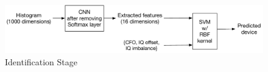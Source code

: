 \begin{figure}[t!]
    \centering
    \includegraphics[width = \linewidth]{plots/algorithm_flow.pdf} 
    \caption{Identification Stage}
    \label{fig:alg}
\end{figure}

